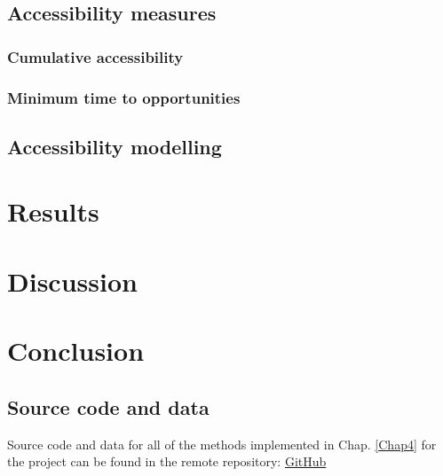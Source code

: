 \documentclass[12pt, a4paper]{report}
\begin{document}
\section{Accessibility measures}

\subsection{Cumulative accessibility}

\subsection{Minimum time to opportunities}

\section{Accessibility modelling}

\chapter{Results} \label{Chap5}
\chapter{Discussion} \label{Chap6}
\chapter{Conclusion} \label{Chap7}


\renewcommand{\bibname}{References}

%

\begin{appendices}
\chapter{Source code and data} \label{System Requirements}
Source code and data for all of the methods implemented in Chap. \ref{Chap4} for the project can be found in the remote repository: \href{https://github.com/rpoandres/MSc_USS_Dissertation}{GitHub}






\end{appendices}
\clearpage
\printglossaries

\end{document}

